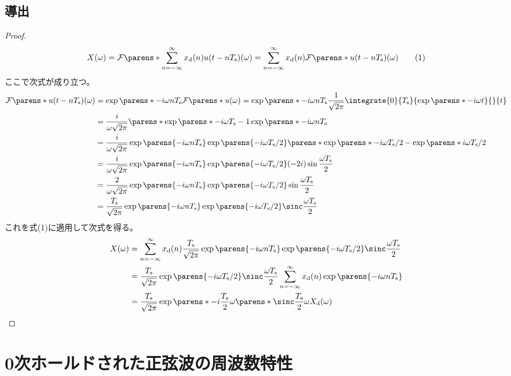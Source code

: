         \subsection{導出}
            \begin{proof}
                \quad\par
                \[ X(\omega) = \FT{\sum_{n=-\infty}^\infty \xd(n)u(t-n\Ts)}(\omega) = \sum_{n=-\infty}^\infty \xd(n)\FT{u(t-n\Ts)}(\omega) \tag{1} \]
                ここで次式が成り立つ。
                \begin{align*}
                    \FT{u(t-n\Ts)}(\omega) &= \exp\parens*{-i \omega n\Ts}\FT{u}(\omega) = \exp\parens*{-i \omega n\Ts}\frac{1}{\sqrt{2\pi}}\integrate{0}{\Ts}{\exp\parens*{-i\omega t}}{}{t} \\
                    &= \frac{i}{\omega\sqrt{2\pi}}\parens*{\exp\parens*{-i \omega\Ts}-1}\exp\parens*{-i \omega n\Ts} \\
                    &= \frac{i}{\omega\sqrt{2\pi}}\exp\parens{-i \omega n\Ts}\exp\parens{-i \omega\Ts/2}\parens*{\exp\parens*{-i \omega\Ts/2} - \exp\parens*{i \omega\Ts/2}} \\
                    &= \frac{i}{\omega\sqrt{2\pi}}\exp\parens{-i \omega n\Ts}\exp\parens{-i \omega\Ts/2}(-2i)\sin\frac{\omega\Ts}{2} \\
                    &= \frac{2}{\omega\sqrt{2\pi}}\exp\parens{-i \omega n\Ts}\exp\parens{-i \omega\Ts/2}\sin\frac{\omega\Ts}{2} \\
                    &= \frac{\Ts}{\sqrt{2\pi}}\exp\parens{-i \omega n\Ts}\exp\parens{-i \omega\Ts/2}\sinc\frac{\omega\Ts}{2}
                \end{align*}
                これを式(1)に適用して次式を得る。
                \begin{align*}
                    X(\omega) &= \sum_{n=-\infty}^\infty \xd(n)\frac{\Ts}{\sqrt{2\pi}}\exp\parens{-i \omega n\Ts}\exp\parens{-i \omega\Ts/2}\sinc\frac{\omega\Ts}{2} \\
                    &= \frac{\Ts}{\sqrt{2\pi}}\exp\parens{-i \omega\Ts/2}\sinc\frac{\omega\Ts}{2} \sum_{n=-\infty}^\infty \xd(n)\exp\parens{-i \omega n\Ts} \\
                    &= \frac{\Ts}{\sqrt{2\pi}}\exp\parens*{-i\frac{\Ts}{2}\omega}\parens*{\sinc \frac{\Ts}{2}\omega}\Xd(\omega)
                \end{align*}
            \end{proof}
    \section{0次ホールドされた正弦波の周波数特性}
        \label{0次ホールドされた正弦波の周波数特性}
